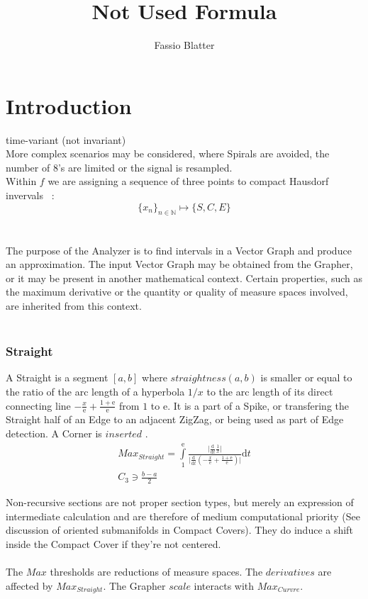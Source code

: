 \documentclass{report}
\begin{document}
\title{Not Used Formula}
\author{Fassio Blatter}
\maketitle

\chapter{Introduction}
time-variant (not invariant)\\
More complex scenarios may be considered, where Spirals are avoided, the number of 8's are limited or the signal is resampled.\\
Within $f$ we are assigning a sequence of three points to compact Hausdorf invervals ~\cite[6.1.3.]{Mortad}:
\begin{equation}
\{x_{n}\}_{n \in \mathbb{N}} \mapsto \{S,C,E\}
\end{equation}\\\\

The purpose of the Analyzer is to find intervals in a Vector Graph and produce an approximation. The input Vector Graph may be obtained from the Grapher, or it may be present in another mathematical context. Certain properties, such as the maximum derivative or the quantity or quality of measure spaces involved, are inherited from this context.\\\\

\subsection{Straight}
A Straight is a segment $[a,b]$ where $straightness(a,b)$ is smaller or equal to the ratio of the arc length of a hyperbola $1/x$ to the arc length of its direct connecting line $-\frac{x}{\mathrm{e}}+\frac{1+\mathrm{e}}{\mathrm{e}}$ from $1$ to $\mathrm{e}$. It is a part of a Spike, or transfering the Straight half of an Edge to an adjacent ZigZag, or being used as part of Edge detection. A Corner is $inserted$ .
\begin{align}
Max_{Straight}=\int \limits _{1}^{\mathrm{e}}\frac{\lvert\frac{\mathrm{d}}{\mathrm{d}t}\frac{1}{x}\rvert}{\lvert\frac{\mathrm{d}}{\mathrm{d}t}(-\frac{x}{\mathrm{e}}+\frac{1+\mathrm{e}}{\mathrm{e}})\rvert}\mathrm{d}t\\
C_{3} \ni \frac{b-a}{2}
\end{align}

Non-recursive sections are not proper section types, but merely an expression of intermediate calculation and are therefore of medium computational priority (See discussion of oriented submanifolds in Compact Covers). They do induce a shift inside the Compact Cover if they're not centered.\\\\
The $Max$ thresholds are reductions of measure spaces. The $derivatives$ are affected by $Max_{Straight}$. The Grapher $scale$ interacts with $Max_{Curvre}.$\\\\
\end{document}
